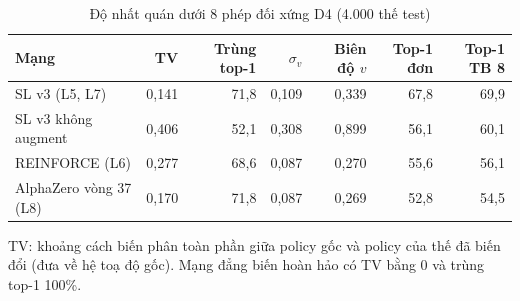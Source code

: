 \begin{table}[H]
  \centering
  \footnotesize
  \caption{Độ nhất quán dưới 8 phép đối xứng D4 (4.000 thế test)}
  \label{tab:cs-mang-doixung}
  \begin{tabular}{lrrrrrr}
    \toprule
    Mạng & TV & Trùng top-1 & $\sigma_v$ & Biên độ $v$ & Top-1 đơn & Top-1 TB 8 \\
    \midrule
    SL v3 (L5, L7) & 0,141 & 71,8 & 0,109 & 0,339 & 67,8 & 69,9 \\
    SL v3 không augment & 0,406 & 52,1 & 0,308 & 0,899 & 56,1 & 60,1 \\
    REINFORCE (L6) & 0,277 & 68,6 & 0,087 & 0,270 & 55,6 & 56,1 \\
    AlphaZero vòng 37 (L8) & 0,170 & 71,8 & 0,087 & 0,269 & 52,8 & 54,5 \\
    \bottomrule
  \end{tabular}
  \par\smallskip\parbox{.95\linewidth}{\footnotesize TV: khoảng cách biến phân toàn phần giữa policy gốc và policy của thế đã biến đổi (đưa về hệ toạ độ gốc). Mạng đẳng biến hoàn hảo có TV bằng 0 và trùng top-1 100\%.}
\end{table}
